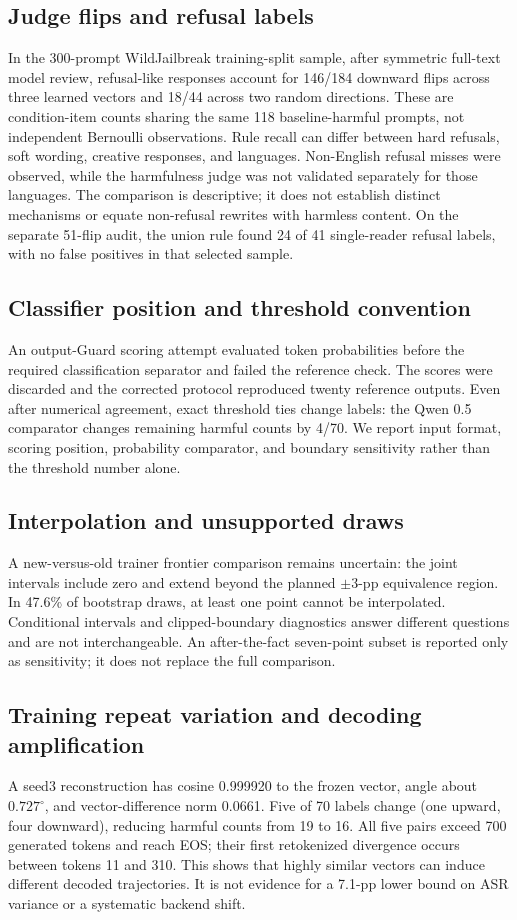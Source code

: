 \subsection{Judge flips and refusal labels}
In the 300-prompt WildJailbreak training-split sample, after symmetric full-text model review, refusal-like responses account for 146/184 downward flips across three learned vectors and 18/44 across two random directions. These are condition-item counts sharing the same 118 baseline-harmful prompts, not independent Bernoulli observations. Rule recall can differ between hard refusals, soft wording, creative responses, and languages. Non-English refusal misses were observed, while the harmfulness judge was not validated separately for those languages. The comparison is descriptive; it does not establish distinct mechanisms or equate non-refusal rewrites with harmless content. On the separate 51-flip audit, the union rule found 24 of 41 single-reader refusal labels, with no false positives in that selected sample.

\subsection{Classifier position and threshold convention}
An output-Guard scoring attempt evaluated token probabilities before the required classification separator and failed the reference check. The scores were discarded and the corrected protocol reproduced twenty reference outputs. Even after numerical agreement, exact threshold ties change labels: the Qwen 0.5 comparator changes remaining harmful counts by 4/70. We report input format, scoring position, probability comparator, and boundary sensitivity rather than the threshold number alone.

\subsection{Interpolation and unsupported draws}
A new-versus-old trainer frontier comparison remains uncertain: the joint intervals include zero and extend beyond the planned $\pm3$-pp equivalence region. In 47.6\% of bootstrap draws, at least one point cannot be interpolated. Conditional intervals and clipped-boundary diagnostics answer different questions and are not interchangeable. An after-the-fact seven-point subset is reported only as sensitivity; it does not replace the full comparison.

\subsection{Training repeat variation and decoding amplification}

A seed3 reconstruction has cosine 0.999920 to the frozen vector, angle about $0.727^\circ$, and vector-difference norm 0.0661. Five of 70 labels change (one upward, four downward), reducing harmful counts from 19 to 16. All five pairs exceed 700 generated tokens and reach EOS; their first retokenized divergence occurs between tokens 11 and 310. This shows that highly similar vectors can induce different decoded trajectories. It is not evidence for a 7.1-pp lower bound on ASR variance or a systematic backend shift.

